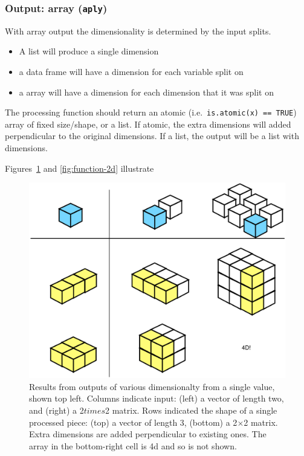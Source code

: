 \documentclass[letterpaper,oneside]{scrartcl}
\begin{document}

\subsubsection{Output: array ({\tt *aply})}

With array output the dimensionality is determined by the input splits.  

\begin{itemize}
  \item A list will produce a single dimension
  \item a data frame will have a dimension for each variable split on
  \item a array will have a dimension for each dimension that it was split on
  
\end{itemize}

The processing function should return an atomic (i.e.\ {\tt is.atomic(x) == TRUE}) array of fixed size/shape, or a list.  If atomic, the extra dimensions will added perpendicular to the original dimensions.  If a list, the output will be a list with dimensions.  

Figures~\ref{fig:function-1d} and \ref{fig:function-2d} illustrate 

\begin{figure}[htbp]
  \centering
  \includegraphics[width= 0.45 \textwidth]{function-1d}
  \caption{Results from outputs of various dimensionalty from a single value, shown top left.  Columns indicate input: (left) a vector of length two, and (right) a 2$times$2 matrix.  Rows indicated the shape of a single processed piece: (top) a vector of length 3, (bottom) a 2$\times$2 matrix.  Extra dimensions are added perpendicular to existing ones.  The array in the bottom-right cell is 4d and so is not shown.}
  \label{fig:function-1d}
\end{figure}
\end{document}
